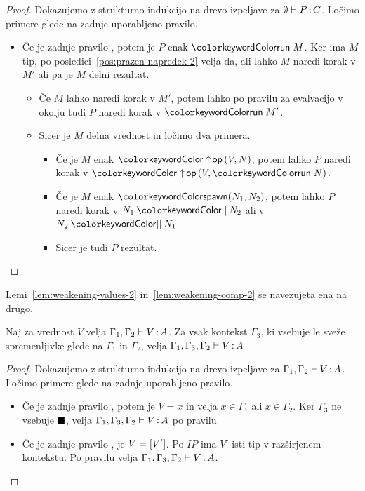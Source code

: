 \begin{proof}
	Dokazujemo z strukturno indukcijo na drevo izpeljave za $\emptyset \vdash P \mathinner{:} C$.
	Ločimo primere glede na zadnje uporabljeno pravilo.
	
	\begin{itemize}
		\item Če je zadnje pravilo , potem je $P$ enak $\tmrun{M}$. Ker ima $M$ tip, po posledici~\ref{pos:prazen-napredek-2} velja da, ali lahko $M$ naredi korak v $M'$ ali pa je $M$ delni rezultat.
		\begin{itemize}
			\item Če $M$ lahko naredi korak v $M'$, potem lahko po pravilu za evalvacijo v okolju tudi $P$ naredi korak v $\tmrun{M'}$.
			\item Sicer je $M$ delna vrednost in ločimo dva primera.
			\begin{itemize}
				\item Če je $M$ enak $\tmopout{op}{V}{N}$, potem lahko $P$ naredi korak v $\tmopout{op}{V}{\tmrun{N}}$.
				\item Če je $M$ enak $\tmspawn{N_1}{N_2}$, potem lahko $P$ naredi korak v $\tmpar{N_1}{N_2}$ ali v $\tmpar{N_2}{N_1}$.
				\item Sicer je tudi $P$ rezultat.
			\end{itemize}
		\end{itemize}
		
	\end{itemize}
\end{proof}

Lemi~\ref{lem:weakening-values-2} in~\ref{lem:weakening-comp-2} se navezujeta ena na drugo.

\begin{lema}\label{lem:weakening-values-2}
	Naj za vrednost $V$ velja $\Gamma_1, \Gamma_2 \vdash V \mathinner{:} A$. Za vsak kontekst $\Gamma_3$, ki vsebuje le sveže spremenljivke glede na $\Gamma_1$ in $\Gamma_2$, velja $\Gamma_1, \Gamma_3, \Gamma_2 \vdash V \mathinner{:} A$
\end{lema}

\begin{proof}
	Dokazujemo z strukturno indukcijo na drevo izpeljave za $\Gamma_1, \Gamma_2 \vdash V \mathinner{:} A$.
	Ločimo primere glede na zadnje uporabljeno pravilo.
	
	\begin{itemize}
		\item Če je zadnje pravilo , potem je $V = x$ in velja $x \in \Gamma_1$ ali $x \in \Gamma_2$.
		Ker $\Gamma_3$ ne vsebuje $\blacksquare$, velja $\Gamma_1, \Gamma_3, \Gamma_2 \vdash V \mathinner{:} A$ po pravilu 
		
		\item Če je zadnje pravilo , je $V = [V']$. Po $IP$ ima $V'$ isti tip v razširjenem kontekstu.
		Po pravilu  velja $\Gamma_1, \Gamma_3, \Gamma_2 \vdash V \mathinner{:} A$.
		
	\end{itemize}
\end{proof}

